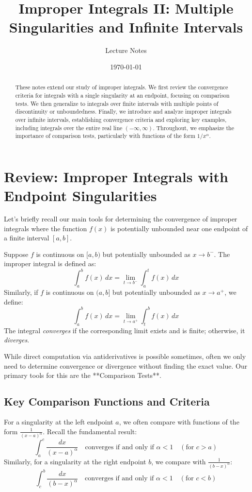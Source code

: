 \documentclass[11pt]{article}
\title{Improper Integrals II: Multiple Singularities and Infinite Intervals}
\author{Lecture Notes}
\date{\today} %
\theoremstyle{mytheoremstyle}
\theoremstyle{mydefinitionstyle}
\begin{document}
\maketitle

\begin{abstract}
These notes extend our study of improper integrals. We first review the convergence criteria for integrals with a single singularity at an endpoint, focusing on comparison tests. We then generalize to integrals over finite intervals with multiple points of discontinuity or unboundedness. Finally, we introduce and analyze improper integrals over infinite intervals, establishing convergence criteria and exploring key examples, including integrals over the entire real line $(-\infty, \infty)$. Throughout, we emphasize the importance of comparison tests, particularly with functions of the form $1/x^\alpha$.
\end{abstract}

\section{Review: Improper Integrals with Endpoint Singularities}

Let's briefly recall our main tools for determining the convergence of improper integrals where the function $f(x)$ is potentially unbounded near one endpoint of a finite interval $[a, b]$.

Suppose $f$ is continuous on $[a, b)$ but potentially unbounded as $x \to b^-$. The improper integral is defined as:
\[ \int_a^b f(x) \, dx = \lim_{t \to b^-} \int_a^t f(x) \, dx \]
Similarly, if $f$ is continuous on $(a, b]$ but potentially unbounded as $x \to a^+$, we define:
\[ \int_a^b f(x) \, dx = \lim_{t \to a^+} \int_t^b f(x) \, dx \]
The integral \emph{converges} if the corresponding limit exists and is finite; otherwise, it \emph{diverges}.

While direct computation via antiderivatives is possible sometimes, often we only need to determine convergence or divergence without finding the exact value. Our primary tools for this are the **Comparison Tests**.

\subsection{Key Comparison Functions and Criteria}
For a singularity at the left endpoint $a$, we often compare with functions of the form $\frac{1}{(x-a)^\alpha}$. Recall the fundamental result:
\[ \int_a^c \frac{dx}{(x-a)^\alpha} \quad \text{converges if and only if } \alpha < 1 \quad (\text{for } c > a) \]
Similarly, for a singularity at the right endpoint $b$, we compare with $\frac{1}{(b-x)^\alpha}$:
\[ \int_c^b \frac{dx}{(b-x)^\alpha} \quad \text{converges if and only if } \alpha < 1 \quad (\text{for } c < b) \]
\end{document}
